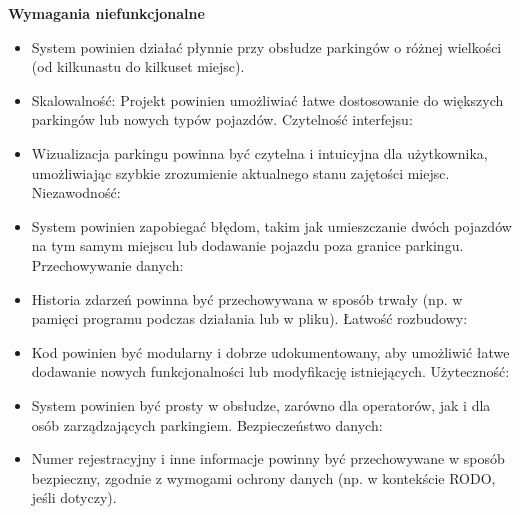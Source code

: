 \noindent \textbf{Wymagania niefunkcjonalne }
\begin{itemize}

\item System powinien działać płynnie przy obsłudze parkingów o różnej wielkości (od kilkunastu do kilkuset miejsc).

\item Skalowalność:
Projekt powinien umożliwiać łatwe dostosowanie do większych parkingów lub nowych typów pojazdów.
Czytelność interfejsu:

\item Wizualizacja parkingu powinna być czytelna i intuicyjna dla użytkownika, umożliwiając szybkie zrozumienie aktualnego stanu zajętości miejsc.
Niezawodność:

\item System powinien zapobiegać błędom, takim jak umieszczanie dwóch pojazdów na tym samym miejscu lub dodawanie pojazdu poza granice parkingu.
Przechowywanie danych:

\item Historia zdarzeń powinna być przechowywana w sposób trwały (np. w pamięci programu podczas działania lub w pliku).
Łatwość rozbudowy:

\item Kod powinien być modularny i dobrze udokumentowany, aby umożliwić łatwe dodawanie nowych funkcjonalności lub modyfikację istniejących.
Użyteczność:

\item System powinien być prosty w obsłudze, zarówno dla operatorów, jak i dla osób zarządzających parkingiem.
Bezpieczeństwo danych:

\item Numer rejestracyjny i inne informacje powinny być przechowywane w sposób bezpieczny, zgodnie z wymogami ochrony danych (np. w kontekście RODO, jeśli dotyczy).

\end{itemize}
 




